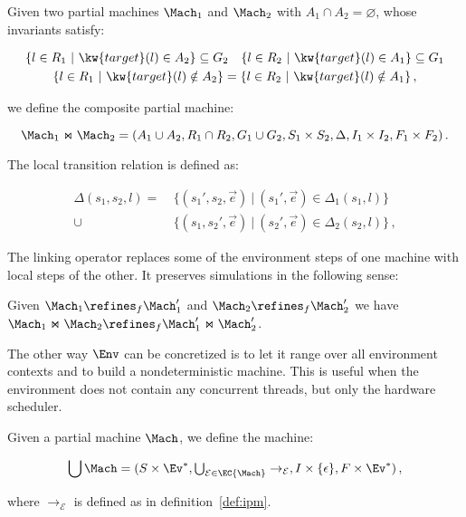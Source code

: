 \begin{definition}
Given two partial machines $\Mach_1$ and $\Mach_2$ with
$A_1 \cap A_2 = \varnothing$,
whose invariants satisfy:
\begin{small}
\begin{gather*}
\{ l \in R_1 \ |\ \kw{target}(l) \in A_2 \} \subseteq G_2 \quad
\{ l \in R_2 \ |\ \kw{target}(l) \in A_1 \} \subseteq G_1 \\
\{ l \in R_1 \ |\ \kw{target}(l) \notin A_2 \} = \{ l \in R_2 \ |\ \kw{target}(l) \notin A_1 \}\,,
\end{gather*}
\end{small}%
we define the composite partial machine:
\begin{small}
\[ \Mach_1 \Join \Mach_2 =
	(A_1 \cup A_2,
	 R_1 \cap R_2,
	 G_1 \cup G_2,
	 S_1 \times S_2,
	 \Delta,
	 I_1 \times I_2,
	 F_1 \times F_2) \,. \]
\end{small}%
The local transition relation is defined as:
\begin{small}
\begin{align*}
\Delta(s_1, s_2, l) =
	&\ \{ (s_1', s_2, \vec{e}) \ |\ (s_1', \vec{e}) \in \Delta_1(s_1, l) \} \\ \cup
	&\ \{ (s_1, s_2', \vec{e}) \ |\ (s_2', \vec{e}) \in \Delta_2(s_2, l) \} \,,
\end{align*}
\end{small}
\end{definition}

The linking operator replaces some of the environment steps of one machine
with local steps of the other.
It preserves simulations in the following sense:

\begin{lemma}
\label{lemma:mono}
Given $\Mach_1 \refines_f \Mach_1'$ and $\Mach_2 \refines_f \Mach_2'$ we have
$\Mach_1 \Join \Mach_2 \refines_f \Mach_1' \Join \Mach_2'$.
\end{lemma}

The other way $\Env$ can be concretized
is to let it range over all environment contexts
and to build a nondeterministic machine.
This is useful when the environment
does not contain any concurrent threads,
but only the hardware scheduler.

\begin{definition}
Given a partial machine $\Mach$,
we define the machine:
\begin{small}
\[ \bigcup \Mach =
	(S \times \Ev^*, \textstyle\bigcup\nolimits_{\mathcal{E} \in \EC{\Mach}} \rightarrow_\mathcal{E},
		I \times \{ \epsilon \}, F \times \Ev^*) \,, \]
\end{small}%
where $\rightarrow_\mathcal{E}$ is defined as in definition~\ref{def:ipm}.
\end{definition}

